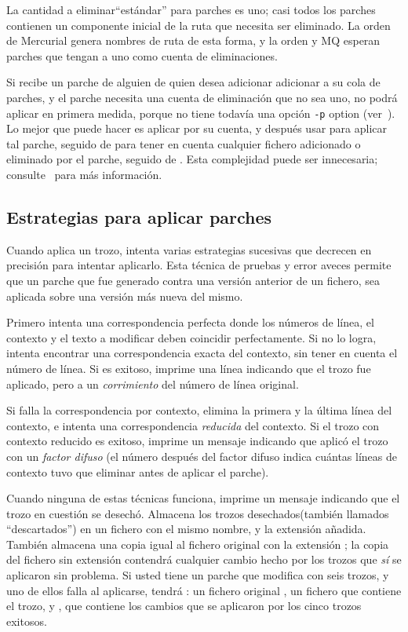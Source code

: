 La cantidad a eliminar``estándar'' para parches es uno; casi todos los
parches contienen un componente inicial de la ruta que necesita ser
eliminado.  La orden  de Mercurial genera nombres de ruta
de esta forma, y la orden  y MQ esperan parches que
tengan a uno como cuenta de eliminaciones.

Si recibe un parche de alguien de quien desea adicionar adicionar a su
cola de parches, y el parche necesita una cuenta de eliminación que no
sea uno, no podrá aplicar  en primera medida,
porque  no tiene todavía una opción \texttt{-p}
option (ver~).  Lo mejor que puede hacer es aplicar
 por su cuenta, y después usar 
para aplicar tal parche, seguido de  para tener en
cuenta cualquier fichero adicionado o eliminado por el parche, seguido
de .  Esta complejidad puede ser innecesaria;
consulte~ para más información.

\subsection{Estrategias para aplicar parches}

Cuando  aplica un trozo, intenta varias estrategias
sucesivas que decrecen en precisión para intentar aplicarlo.  Esta
técnica de pruebas y error aveces permite que un parche que fue
generado contra una versión anterior de un fichero, sea aplicada sobre
una versión más nueva del mismo.

Primero  intenta una correspondencia perfecta donde los
números de línea, el contexto y el texto a modificar deben coincidir
perfectamente.  Si no lo logra, intenta encontrar una correspondencia
exacta del contexto, sin tener en cuenta el número de línea.  Si es
exitoso, imprime una línea indicando que el trozo fue aplicado, pero a
un \emph{corrimiento} del número de línea original.

Si falla la correspondencia por contexto,  elimina la
primera y la última línea del contexto, e intenta una correspondencia
\emph{reducida} del contexto.  Si el trozo con contexto reducido es
exitoso, imprime un mensaje indicando que aplicó el trozo con un
\emph{factor difuso} (el número después del factor difuso indica
cuántas líneas de contexto  tuvo que eliminar antes de
aplicar el parche).

Cuando ninguna de estas técnicas funciona,  imprime un
mensaje indicando que el trozo en cuestión se desechó.  Almacena los
trozos desechados(también llamados ``descartados'') en un fichero con
el mismo nombre, y la extensión  añadida.  También
almacena una copia igual al fichero original con la extensión
; la copia del fichero sin extensión contendrá
cualquier cambio hecho por los trozos que \emph{sí} se aplicaron sin
problema.  Si usted tiene un parche que modifica  con
seis trozos, y uno de ellos falla al aplicarse, tendrá : un fichero
original , un fichero  que
contiene el trozo, y , que contiene los cambios que se
aplicaron por los cinco trozos exitosos.

